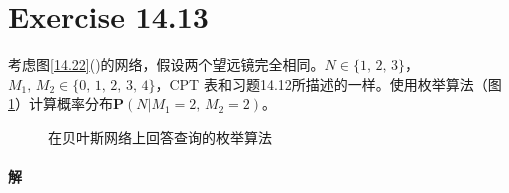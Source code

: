 \documentclass{article}
\begin{document}
\section{Exercise 14.13}
考虑图\ref{14.22}()的网络，假设两个望远镜完全相同。$N \in \{1,\, 2,\, 3\}$，$M_1,\, M_2 \in \{0,\, 1,\, 2,\, 3,\, 4\}$，CPT 表和习题14.12所描述的一样。使用枚举算法（图\ref{14.9}）计算概率分布$\mathbf{P}(N | M_1 = 2,\, M_2 = 2)$。
\begin{figure}
    \centering
    \caption{在贝叶斯网络上回答查询的枚举算法}
    \label{14.9}
\end{figure}
\paragraph{解}
\end{document}
